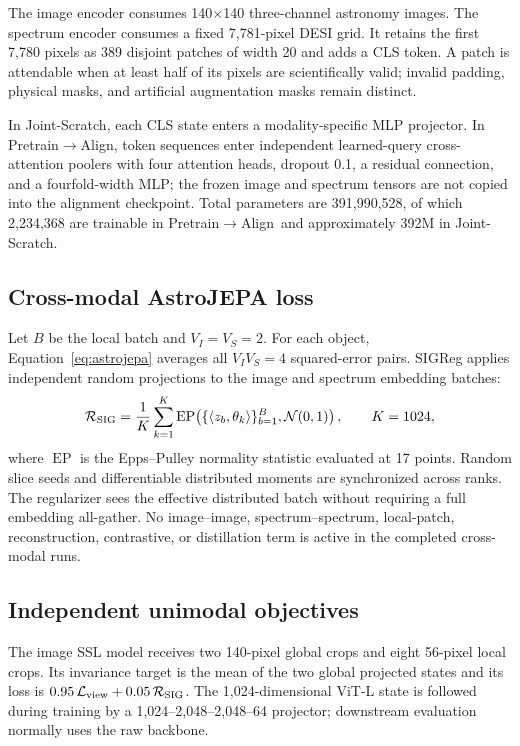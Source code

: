\documentclass{article}
\newcommand{\prealign}{Pretrain$\rightarrow$Align}
\newcommand{\joint}{Joint-Scratch}
\begin{document}
The image encoder consumes 140$\times$140 three-channel astronomy images.
The spectrum encoder consumes a fixed 7,781-pixel DESI grid.
It retains the first 7,780 pixels as 389 disjoint patches of width 20 and adds
a CLS token.
A patch is attendable when at least half of its pixels are scientifically
valid; invalid padding, physical masks, and artificial augmentation masks
remain distinct.

In \joint, each CLS state enters a modality-specific MLP projector.
In \prealign, token sequences enter independent learned-query cross-attention
poolers with four attention heads, dropout 0.1, a residual connection, and a
fourfold-width MLP; the frozen image and spectrum tensors are not copied into
the alignment checkpoint.
Total parameters are 391,990,528, of which 2,234,368 are trainable in
\prealign\ and approximately 392M in \joint.

\subsection{Cross-modal AstroJEPA loss}

Let $B$ be the local batch and $V_I=V_S=2$.
For each object, Equation~\ref{eq:astrojepa} averages all
$V_I V_S=4$ squared-error pairs.
SIGReg applies independent random projections to the image and spectrum
embedding batches:
\[
\mathcal R_{\rm SIG}
=\frac{1}{K}\sum_{k=1}^{K}
\operatorname{EP}\!\left(\{\langle z_b,\theta_k\rangle\}_{b=1}^{B},
\mathcal N(0,1)\right),
\qquad K=1024,
\]
where $\operatorname{EP}$ is the Epps--Pulley normality statistic evaluated at
17 points.
Random slice seeds and differentiable distributed moments are synchronized
across ranks.
The regularizer sees the effective distributed batch without requiring a full
embedding all-gather.
No image--image, spectrum--spectrum, local-patch, reconstruction, contrastive,
or distillation term is active in the completed cross-modal runs.

\subsection{Independent unimodal objectives}

The image SSL model receives two 140-pixel global crops and eight 56-pixel local
crops.
Its invariance target is the mean of the two global projected states and its
loss is $0.95\,\mathcal L_{\rm view}+0.05\,\mathcal R_{\rm SIG}$.
The 1,024-dimensional ViT-L state is followed during training by a
1,024--2,048--2,048--64 projector; downstream evaluation normally uses the raw
backbone.
\end{document}
